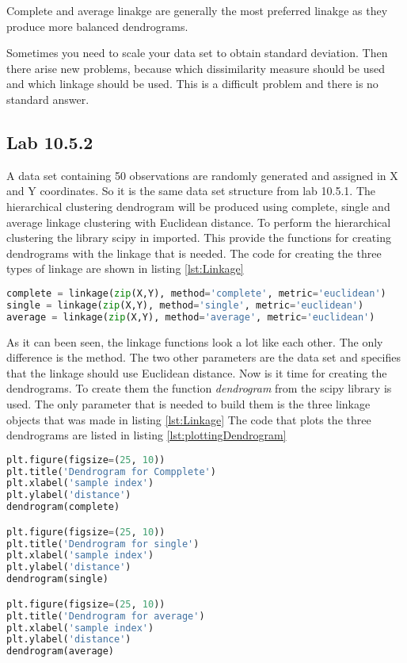 Complete and average linakge are generally the most preferred linakge as they produce more balanced dendrograms. 

Sometimes you need to scale your data set to obtain standard deviation. Then there arise new problems, because which dissimilarity measure should be used and which linkage should be used. This is a difficult problem and there is no standard answer.

\subsection{Lab 10.5.2}
A data set containing 50 observations are randomly generated and assigned in X and Y coordinates. So it is the same data set structure from lab 10.5.1.
The hierarchical clustering dendrogram will be produced using complete, single and average linkage clustering with Euclidean distance.
To perform the hierarchical clustering the library scipy in imported. This provide the functions for creating dendrograms with the linkage that is needed. 
The code for creating the three types of linkage are shown in listing
\ref{lst:Linkage}

\begin{lstlisting}[language=Python, label=lst:Linkage, caption=The code that apllies the three different linkage on the data set]
complete = linkage(zip(X,Y), method='complete', metric='euclidean')
single = linkage(zip(X,Y), method='single', metric='euclidean') 
average = linkage(zip(X,Y), method='average', metric='euclidean')
\end{lstlisting}

As it can been seen, the linkage functions look a lot like each other. The only difference is the method. The two other parameters are the data set and specifies that the linkage should use Euclidean distance. 
Now is it time for creating the dendrograms. To create them the function \emph{dendrogram} from the scipy library is used. The only parameter that is needed to build them is the three linkage objects that was made in listing \ref{lst:Linkage}
The code that plots the three dendrograms are listed in listing \ref{lst:plottingDendrogram}

\begin{lstlisting}[language=Python, label=lst:plottingDendrogram, caption=The python code that plots the dendrograms for the three different linakge]
plt.figure(figsize=(25, 10))
plt.title('Dendrogram for Compplete')
plt.xlabel('sample index')
plt.ylabel('distance')
dendrogram(complete)

plt.figure(figsize=(25, 10))
plt.title('Dendrogram for single')
plt.xlabel('sample index')
plt.ylabel('distance')
dendrogram(single)

plt.figure(figsize=(25, 10))
plt.title('Dendrogram for average')
plt.xlabel('sample index')
plt.ylabel('distance')
dendrogram(average)
\end{lstlisting}

